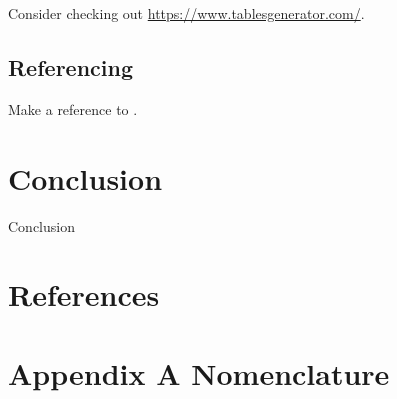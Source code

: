 \documentclass[11pt,a4paper,twoside]{article}
\begin{document}
Consider checking out \url{https://www.tablesgenerator.com/}.

\subsection{Referencing}
Make a reference to \citep{NormanS.Nise2012}.

\section{Conclusion}
Conclusion

\newpage
\section*{References}
\printbibliography[title={\null}]

\newpage
\section*{Appendix A Nomenclature}
\end{document}
